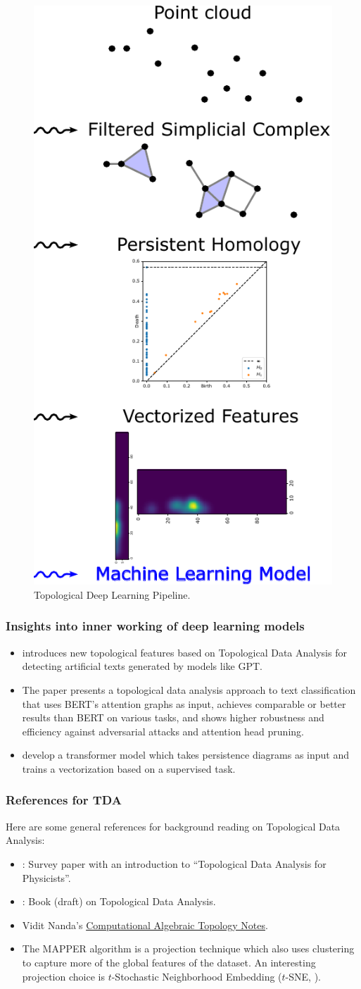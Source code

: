 \documentclass[11pt, a4paper]{amsart}
\begin{document}
\begin{figure}
	\centering
	\includegraphics[width=0.2\linewidth]{figures/topological_data_analysis/topological_deep_learning}
	\caption{
		Topological Deep Learning Pipeline.
		\label{fig:topological_deep_learning}
	}
\end{figure}  

\subsubsection{Insights into inner working of deep learning models}

\begin{itemize}
	\item \cite{kushnareva-etal-2021-artificial} introduces new topological features based on Topological Data Analysis for detecting artificial texts generated by models like GPT.
	\item The paper \cite{perez2022topological} presents a topological data analysis approach to text classification that uses BERT’s attention graphs as input, achieves comparable or better results than BERT on various tasks, and shows higher robustness and efficiency against adversarial attacks and attention head pruning.
	\item \cite{reinauer2021persformer} develop a transformer model which takes persistence diagrams as input and trains a vectorization based on a supervised task.
\end{itemize}
     


\subsubsection{References for TDA}

Here are some general references for background reading on Topological Data Analysis:
\begin{itemize}
	\item \cite{murugan2019introduction}: Survey paper with an introduction to ``Topological Data Analysis for Physicists''.
	\item \cite{dey2021computational}: Book (draft) on Topological Data Analysis.
	\item Vidit Nanda's \href{http://people.maths.ox.ac.uk/nanda/cat/TDANotes.pdf}{Computational Algebraic Topology Notes}.
	\item The MAPPER algorithm is a projection technique which also uses clustering to capture more of the global features of the dataset.
	An interesting projection choice is $t$-Stochastic Neighborhood Embedding ($t$-SNE, \cite{JMLR:v9:vandermaaten08a}).
\end{itemize}
\end{document}
